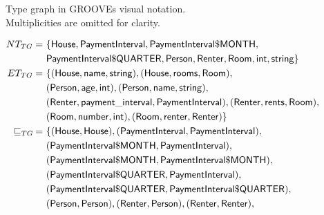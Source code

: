 \begin{figure}[p]
    \centering
    \begin{subfigure}{\textwidth}
        \centering
        
        \caption{Type graph in GROOVEs visual notation. Multiplicities are omitted for clarity.}
    \end{subfigure}
    
    \begin{subfigure}{\textwidth}
        \centering
        \begin{align*}
            NT_{TG} =\ & \{ 
                \type{House},
                \type{PaymentInterval},
                \type{PaymentInterval\$MONTH},\\&
                \type{PaymentInterval\$QUARTER},
                \type{Person},
                \type{Renter},
                \type{Room},
                \type{int},
                \type{string}
            \}\\
            ET_{TG} =\ & \{ 
                ( \type{House}, \type{name}, \type{string} ),
                ( \type{House}, \type{rooms}, \type{Room} ),\\&
                ( \type{Person}, \type{age}, \type{int} ),
                ( \type{Person}, \type{name}, \type{string} ),\\&
                ( \type{Renter}, \type{payment\_interval}, \type{PaymentInterval} ),
                ( \type{Renter}, \type{rents}, \type{Room} ),\\&
                ( \type{Room}, \type{number}, \type{int} ),
                ( \type{Room}, \type{renter}, \type{Renter} )
            \}\\
            \sqsubseteq_{TG}\: =\ & \{ 
                ( \type{House}, \type{House} ),
                ( \type{PaymentInterval}, \type{PaymentInterval} ),\\&
                ( \type{PaymentInterval\$MONTH}, \type{PaymentInterval} ),\\&
                ( \type{PaymentInterval\$MONTH}, \type{PaymentInterval\$MONTH} ),\\&
                ( \type{PaymentInterval\$QUARTER}, \type{PaymentInterval} ),\\&
                ( \type{PaymentInterval\$QUARTER}, \type{PaymentInterval\$QUARTER} ),\\&
                ( \type{Person}, \type{Person} ),
                ( \type{Renter}, \type{Person} ),
                ( \type{Renter}, \type{Renter} ),

\end{align*}
\end{subfigure}
\end{figure}

